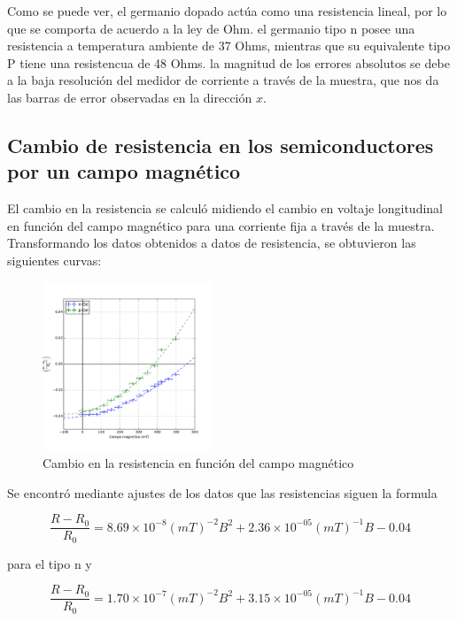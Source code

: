 \documentclass[twocolumn,showkeys,preprintnumbers,amsmath,amssymb]{revtex4}
\begin{document}
		Como se puede ver, el germanio dopado actúa como una resistencia lineal, por lo que se comporta de acuerdo a la ley de Ohm. el germanio tipo n posee una resistencia a temperatura ambiente de 37 Ohms, mientras que su equivalente tipo P tiene una resistencua de 48 Ohms. la magnitud de los errores absolutos se debe a la baja resolución del medidor de corriente a través de la muestra, que nos da las barras de error observadas en la dirección $x$.
		
	\subsection{Cambio de resistencia en los semiconductores por un campo magnético}
	
		El cambio en la resistencia se calculó midiendo el cambio en voltaje longitudinal en función del campo magnético para una corriente fija a través de la muestra. Transformando los datos obtenidos a datos de resistencia, se obtuvieron las siguientes curvas:
		
		\begin{figure}[H]
			\centering
			\includegraphics[width=0.45\textwidth]{RMag.pdf}
			\caption{Cambio en la resistencia en función del campo magnético}
			\label{fig:RMag}
		\end{figure}
		
		Se encontró mediante ajustes de los datos que las resistencias siguen la formula
		
	\begin{equation}
		\frac{R-R_0}{R_0}=8.69\times 10^{-8}(mT)^{-2}B^2 + 2.36\times 10^{-05}(mT)^{-1}B - 0.04				
	\end{equation}				

para el tipo n y 

	\begin{equation}
		\frac{R-R_0}{R_0}=1.70\times 10^{-7}(mT)^{-2}B^2 + 3.15\times 10^{-05}(mT)^{-1}B - 0.04		
	\end{equation}		
\end{document}
